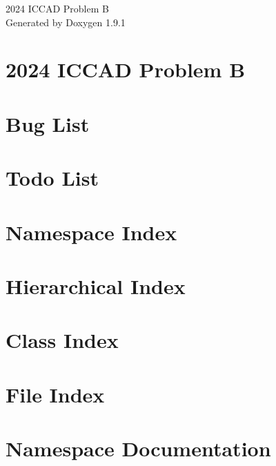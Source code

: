 \let\mypdfximage\pdfximage\def\pdfximage{\immediate\mypdfximage}\documentclass[twoside]{book}
\newcommand{\+}{\discretionary{\mbox{\scriptsize$\hookleftarrow$}}{}{}}
\newcommand{\clearemptydoublepage}{%
  \newpage{\pagestyle{empty}\cleardoublepage}%
}
\begin{document}
\raggedbottom

\hypersetup{pageanchor=false,
             bookmarksnumbered=true,
             pdfencoding=unicode
            }
\begin{titlepage}
\vspace*{7cm}
\begin{center}%
{\Large 2024 ICCAD Problem B }\\
\vspace*{1cm}
{\large Generated by Doxygen 1.9.1}\\
\end{center}
\end{titlepage}
\clearemptydoublepage
{}
\tableofcontents
\clearemptydoublepage
{}
\hypersetup{pageanchor=true}

\chapter{2024 ICCAD Problem B}
\label{md_README}

\chapter{Bug List}
\label{bug}

\chapter{Todo List}
\label{todo}

\chapter{Namespace Index}

\chapter{Hierarchical Index}

\chapter{Class Index}

\chapter{File Index}

\chapter{Namespace Documentation}


\end{document}
